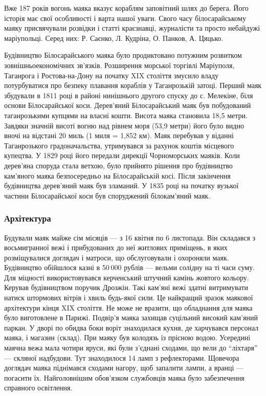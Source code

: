 Вже 187 років вогонь маяка вказує кораблям заповітний шлях до берега. Його
історія має свої особливості і варта нашої уваги. Свого часу білосарайському
маяку присвячували розвідки і статті краєзнавці, журналісти та просто небайдужі
маріупольці. Серед них: Р. Саєнко, Л. Кудріна, О. Панков, А. Цяцько.

Будівництво Білосарайського маяка було продиктовано потужним розвитком
зовнішньоекономічних зв'язків. Розширення морської торгівлі Маріуполя,
Таганрога і Ростова-на-Дону на початку XIX століття змусило владу потурбуватися
про безпеку плавання кораблів у Таганрозькій затоці. Перший маяк збудували в
1811 році в районі нинішнього другого спуску до с. Мелекіне, біля основи
Білосарайської коси. Дерев'яний Білосарайський маяк був побудований
таганрозькими купцями на власні кошти. Висота маяка становила 18,5 метри.
Завдяки значній висоті вогню над рівнем моря (53,9 метри) його було видно вночі
на відстані 20 миль (1 миля = 1,852 км). Маяк перебував у віданні Таганрозького
градоначальства, утримувався за рахунок коштів місцевого купецтва. У 1829 році
його передали дирекції Чорноморських маяків. Коли дерев'яна споруда стала
ветхою, було прийнято рішення про будівництво кам'яного маяка безпосередньо на
Білосарайській косі. Після закінчення будівництва дерев'яний маяк був зламаний.
У 1835 році на початку вузької частини Білосарайської коси був споруджений
білокам'яний маяк.

\subsubsection{Архітектура}


Будували маяк майже сім місяців — з 16 квітня по 6 листопада. Він складався з
восьмигранної вежі і прибудованих до неї житлових приміщень, в яких
розміщувалися доглядач і матроси, що обслуговували і охороняли маяк.
Будівництво обійшлося казні в 50 000 рублів — вельми солідну на ті часи суму.
Для міцності використовувався керченський штучний камінь жовтого кольору.
Керував будівництвом поручик Дрозжін. Такі кам'яні вежі здатні витримувати
натиск штормових вітрів і хвиль будь-якої сили. Це найкращий зразок маякової
архітектури кінця XIX століття. Не може не вразити, що обладнання для маяка
було виготовлене в Парижі. Подвір'я маяка захищав суцільний високий кам'яний
паркан. У дворі по обидва боки воріт знаходилася кухня, де харчувався персонал
маяка, і магазин (склад). При маяку був колодязь із прісною водою. Усередині
маячна вежа мала чотири яруси, які були з'єднані сходами, що вели до \enquote{ліхтаря}
— скляної надбудови. Тут знаходилося 14 ламп з рефлекторами. Щовечора доглядач
маяка піднімався сходами нагору, щоб запалити лампи, а вранці — погасити їх.
Найголовнішим обов'язком службовців маяка було забезпечення справного
освітлення.

